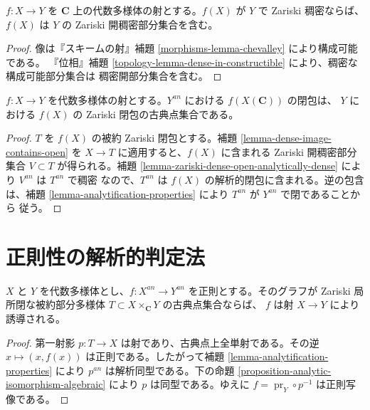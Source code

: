 \begin{lemma}
\label{lemma-dense-image-contains-open}
$f : X \to Y$ を $\mathbf C$ 上の代数多様体の射とする。$f(X)$ が $Y$ で Zariski
稠密ならば、$f(X)$ は $Y$ の Zariski 開稠密部分集合を含む。
\end{lemma}

\begin{proof}
像は『スキームの射』補題 \ref{morphisms-lemma-chevalley} により構成可能である。
『位相』補題 \ref{topology-lemma-dense-in-constructible} により、稠密な構成可能部分集合は
稠密開部分集合を含む。
\end{proof}

\begin{proposition}
\label{proposition-image-closure}
$f : X \to Y$ を代数多様体の射とする。$Y^{an}$ における $f(X(\mathbf C))$ の閉包は、
$Y$ における $f(X)$ の Zariski 閉包の古典点集合である。
\end{proposition}

\begin{proof}
$T$ を $f(X)$ の被約 Zariski 閉包とする。補題
\ref{lemma-dense-image-contains-open} を $X\to T$ に適用すると、$f(X)$ に含まれる
Zariski 開稠密部分集合 $V\subset T$ が得られる。補題
\ref{lemma-zariski-dense-open-analytically-dense} により $V^{an}$ は $T^{an}$ で稠密
なので、$T^{an}$ は $f(X)$ の解析的閉包に含まれる。逆の包含は、補題
\ref{lemma-analytification-properties} により $T^{an}$ が $Y^{an}$ で閉であることから
従う。
\end{proof}

\section{正則性の解析的判定法}
\label{section-analytic-regularity}

\begin{proposition}
\label{proposition-algebraic-graph-holomorphic-regular}
$X$ と $Y$ を代数多様体とし、$f : X^{an}\to Y^{an}$ を正則とする。そのグラフが
Zariski 局所閉な被約部分多様体 $T\subset X\times_{\mathbf C}Y$ の古典点集合ならば、
$f$ は射 $X\to Y$ により誘導される。
\end{proposition}

\begin{proof}
第一射影 $p:T\to X$ は射であり、古典点上全単射である。その逆
$x\mapsto(x,f(x))$ は正則である。したがって補題
\ref{lemma-analytification-properties} により $p^{an}$ は解析同型である。下の命題
\ref{proposition-analytic-isomorphism-algebraic} により $p$ は同型である。ゆえに
$f=\operatorname{pr}_Y\circ p^{-1}$ は正則写像である。
\end{proof}

